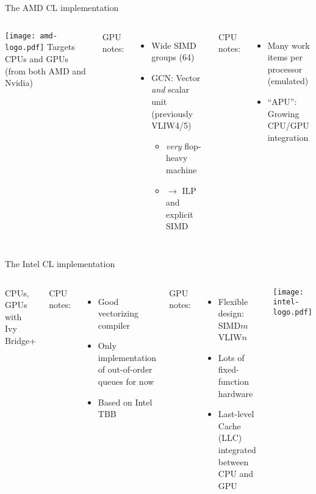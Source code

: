 \documentclass[english,compress]{beamer}
\begin{document}
\begin{frame}{The AMD CL implementation}
  \begin{columns}
      \texttt{[image: amd-logo.pdf]}
      Targets CPUs and GPUs (from both AMD and Nvidia)

      \medskip
      GPU notes:
      \begin{itemize}
        \item Wide SIMD groups (64)
        \item GCN: Vector \emph{and} scalar unit (previously VLIW4/5)
        \begin{itemize}
          \item \emph{very} flop-heavy machine
          \item $\rightarrow$ ILP and explicit SIMD
        \end{itemize}
      \end{itemize}

      CPU notes:
      \begin{itemize}
        \item Many work items per processor (emulated)
        \item ``APU'': Growing CPU/GPU integration
      \end{itemize}
  \end{columns}
\end{frame}

\begin{frame}{The Intel CL implementation}
  \begin{columns}
      CPUs, GPUs with Ivy Bridge+

      \medskip
      CPU notes:
      \begin{itemize}
        \item Good vectorizing compiler
        \item Only implementation of out-of-order queues for now
        \item Based on Intel TBB
      \end{itemize}
      GPU notes:
      \begin{itemize}
        \item Flexible design: SIMD$m$ VLIW$n$
        \item Lots of fixed-function hardware
        \item Last-level Cache (LLC) integrated between CPU and GPU
      \end{itemize}

      \texttt{[image: intel-logo.pdf]}
  \end{columns}
\end{frame}

\end{document}
